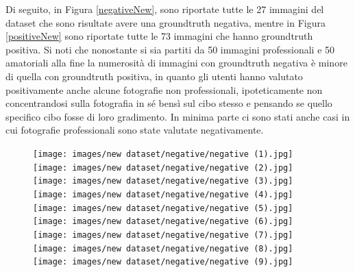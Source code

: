 Di seguito, in Figura \ref{negativeNew}, sono riportate tutte le 27 immagini del dataset che  sono risultate avere una groundtruth negativa, mentre in Figura \ref{positiveNew} sono riportate tutte le 73 immagini che hanno groundtruth positiva. Si noti che nonostante si sia partiti da 50 immagini professionali e 50 amatoriali alla fine la numerosità di immagini con groundtruth negativa è minore di quella con groundtruth positiva, in quanto gli utenti hanno valutato positivamente anche alcune fotografie non professionali, ipoteticamente non concentrandosi sulla fotografia in sé bensì sul cibo stesso e pensando se quello specifico cibo fosse di loro gradimento. In minima parte ci sono stati anche casi in cui fotografie professionali sono state valutate negativamente.

\begin{figure}[H]
\centering
\texttt{[image: images/new dataset/negative/negative (1).jpg]}
\quad
\texttt{[image: images/new dataset/negative/negative (2).jpg]}
\quad
\vspace{5mm}
\texttt{[image: images/new dataset/negative/negative (3).jpg]}
\quad
\texttt{[image: images/new dataset/negative/negative (4).jpg]}
\quad
\vspace{5mm}
\texttt{[image: images/new dataset/negative/negative (5).jpg]}
\quad
\texttt{[image: images/new dataset/negative/negative (6).jpg]}
\quad
\texttt{[image: images/new dataset/negative/negative (7).jpg]}
\quad
\vspace{5mm}
\texttt{[image: images/new dataset/negative/negative (8).jpg]}
\quad
\texttt{[image: images/new dataset/negative/negative (9).jpg]}
\quad
\end{figure}


